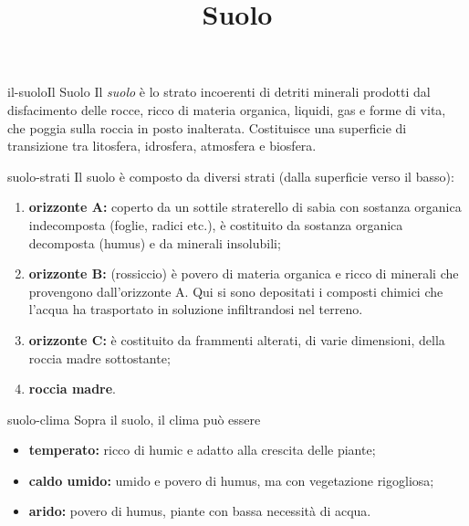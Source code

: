 \documentclass[preview]{standalone}
\begin{document}
\title{Suolo}
\genpage

\begin{snippetdefinition}{il-suolo}{Il Suolo}
    Il \textit{suolo} è lo strato incoerenti di detriti minerali prodotti dal disfacimento delle rocce,
    ricco di materia organica, liquidi, gas e forme di vita, che poggia sulla roccia
    in posto inalterata. Costituisce una superficie di transizione tra litosfera,
    idrosfera, atmosfera e biosfera.
\end{snippetdefinition}

\begin{snippet}{suolo-strati}
    Il suolo è composto da diversi strati (dalla superficie verso il basso):
    \begin{enumerate}
        \item \textbf{orizzonte A:} coperto da un sottile
            straterello di sabia con sostanza organica indecomposta (foglie, radici etc.),
            è costituito da sostanza organica decomposta (humus) e da minerali insolubili;
        \item \textbf{orizzonte B:} (rossiccio) è povero di materia organica e ricco di minerali che provengono
            dall'orizzonte A. Qui si sono depositati i composti chimici che l'acqua ha trasportato in soluzione infiltrandosi nel terreno.
        \item \textbf{orizzonte C:} è costituito da frammenti alterati, di varie dimensioni, della roccia madre sottostante;
        \item \textbf{roccia madre}.
    \end{enumerate}
\end{snippet}

\begin{snippet}{suolo-clima}
    Sopra il suolo, il clima può essere
    \begin{itemize}
        \item \textbf{temperato:} ricco di humic e adatto alla crescita delle piante;
        \item \textbf{caldo umido:} umido e povero di humus, ma con vegetazione rigogliosa;
        \item \textbf{arido:} povero di humus, piante con bassa necessità di acqua.
    \end{itemize}
\end{snippet}

\end{document}
